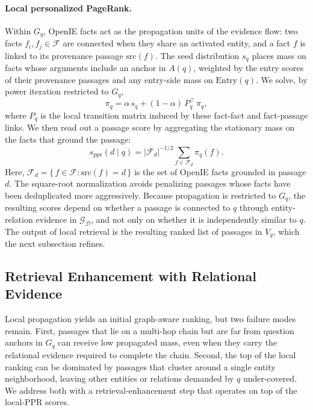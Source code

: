 \paragraph{Local personalized PageRank.}
Within $G_q$, OpenIE facts act as the propagation units of the evidence
flow: two facts $f_i, f_j \in \mathcal{F}$ are connected when they share
an activated entity, and a fact $f$ is linked to its provenance passage
$\mathrm{src}(f)$. The seed distribution $s_q$ places mass on facts whose
arguments include an anchor in $A(q)$, weighted by the entry scores of
their provenance passages and any entry-side mass on $\mathrm{Entry}(q)$.
We solve, by power iteration restricted to $G_q$,
\begin{equation}
\label{eq:local-ppr}
\pi_q = \alpha\, s_q + (1-\alpha)\, P_q^{\!\top}\, \pi_q,
\end{equation}
where $P_q$ is the local transition matrix induced by these fact-fact
and fact-passage links. We then read out a passage score by aggregating
the stationary mass on the facts that ground the passage:
\begin{equation}
\label{eq:passage-score}
s_{\mathrm{ppr}}(d \mid q)
=
|\mathcal{F}_d|^{-1/2}
\sum_{f \in \mathcal{F}_d} \pi_q(f).
\end{equation}
Here, $\mathcal{F}_d = \{\, f \in \mathcal{F} : \mathrm{src}(f) = d \,\}$
is the set of OpenIE facts grounded in passage $d$.
The square-root normalization avoids penalizing passages whose facts have
been deduplicated more aggressively. Because propagation is restricted to
$G_q$, the resulting scores depend on whether a passage is connected to
$q$ through entity-relation evidence in $\mathcal{G}_{\mathcal{D}}$, and
not only on whether it is independently similar to $q$. The output of
local retrieval is the resulting ranked list of passages in $V_q$, which
the next subsection refines.

\subsection{Retrieval Enhancement with Relational Evidence}
\label{sec:method:enhancement}

Local propagation yields an initial graph-aware ranking, but two failure
modes remain. First, passages that lie on a multi-hop chain but are far
from question anchors in $G_q$ can receive low propagated mass, even when
they carry the relational evidence required to complete the chain.
Second, the top of the local ranking can be dominated by passages that
cluster around a single entity neighborhood, leaving other entities or
relations demanded by $q$ under-covered. We address both with a
retrieval-enhancement step that operates on top of the local-PPR scores.

